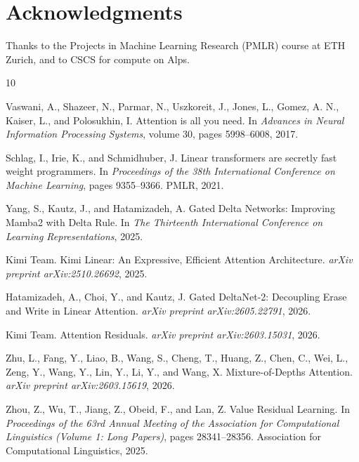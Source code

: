 \documentclass{article}
\begin{document}
\section{Acknowledgments}
Thanks to the Projects in Machine Learning Research (PMLR) course at ETH Zurich, and to CSCS for compute on Alps.

\begin{thebibliography}{10}

Vaswani, A., Shazeer, N., Parmar, N., Uszkoreit, J., Jones, L., Gomez, A. N., Kaiser, L., and Polosukhin, I.
\newblock Attention is all you need.
\newblock In \emph{Advances in Neural Information Processing Systems}, volume 30, pages 5998--6008, 2017.

Schlag, I., Irie, K., and Schmidhuber, J.
\newblock Linear transformers are secretly fast weight programmers.
\newblock In \emph{Proceedings of the 38th International Conference on Machine Learning}, pages 9355--9366. PMLR, 2021.

Yang, S., Kautz, J., and Hatamizadeh, A.
\newblock Gated Delta Networks: Improving Mamba2 with Delta Rule.
\newblock In \emph{The Thirteenth International Conference on Learning Representations}, 2025.

Kimi Team.
\newblock Kimi Linear: An Expressive, Efficient Attention Architecture.
\newblock \emph{arXiv preprint arXiv:2510.26692}, 2025.


Hatamizadeh, A., Choi, Y., and Kautz, J.
\newblock Gated DeltaNet-2: Decoupling Erase and Write in Linear Attention.
\newblock \emph{arXiv preprint arXiv:2605.22791}, 2026.

Kimi Team.
\newblock Attention Residuals.
\newblock \emph{arXiv preprint arXiv:2603.15031}, 2026.

Zhu, L., Fang, Y., Liao, B., Wang, S., Cheng, T., Huang, Z., Chen, C., Wei, L., Zeng, Y., Wang, Y., Lin, Y., Li, Y., and Wang, X.
\newblock Mixture-of-Depths Attention.
\newblock \emph{arXiv preprint arXiv:2603.15619}, 2026.

Zhou, Z., Wu, T., Jiang, Z., Obeid, F., and Lan, Z.
\newblock Value Residual Learning.
\newblock In \emph{Proceedings of the 63rd Annual Meeting of the Association for Computational Linguistics (Volume 1: Long Papers)}, pages 28341--28356. Association for Computational Linguistics, 2025.


\end{thebibliography}
\end{document}
